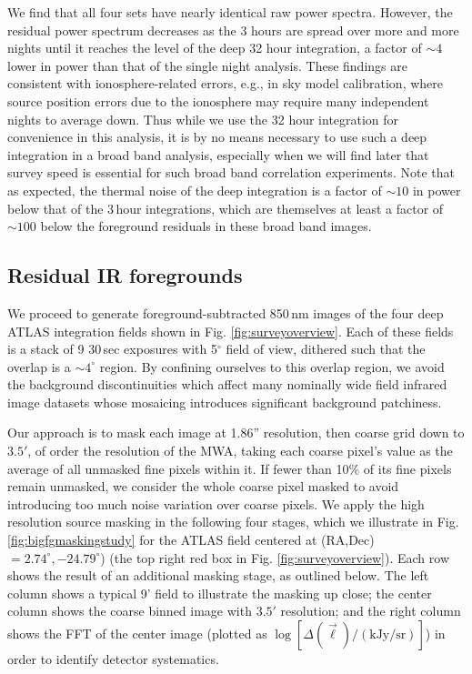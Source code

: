 \documentclass{emulateapj}
\begin{document}
We find that all four sets have nearly identical raw power spectra. However, the residual power spectrum decreases as the 3 hours are spread over more and more nights until it reaches the level of the deep 32 hour integration, a factor of $\sim4$ lower in power than that of the single night analysis. These findings are consistent with ionosphere-related errors, e.g., in sky model calibration, where source position errors due to the ionosphere may require many independent nights to average down. Thus while we use the 32 hour integration for convenience in this analysis, it is by no means necessary to use such a deep integration in a broad band analysis, especially when we will find later that survey speed is essential for such broad band correlation experiments. Note that as expected, the thermal noise of the deep integration is a factor of $\sim10$ in power below that of the 3\,hour integrations, which are themselves at least a factor of $\sim100$ below the foreground residuals in these broad band images.

\subsection{Residual IR foregrounds}
\label{sec:resirfg}

We proceed to generate foreground-subtracted 850\,nm images of the four deep ATLAS integration fields shown in Fig. \ref{fig:surveyoverview}. Each of these fields is a stack of 9 30\,sec exposures with 5$^\circ$ field of view, dithered such that the overlap is a $\sim4^\circ$ region. By confining ourselves to this overlap region, we avoid the background discontinuities which affect many nominally wide field infrared image datasets whose mosaicing introduces significant background patchiness. 

Our approach is to mask each image at 1.86'' resolution, then coarse grid down to $3.5'$, of order the resolution of the MWA, taking each coarse pixel's value as the average of all unmasked fine pixels within it. If fewer than 10\% of its fine pixels remain unmasked, we consider the whole coarse pixel masked to avoid introducing too much noise variation over coarse pixels. We apply the high resolution source masking in the following four stages, which we illustrate in Fig. \ref{fig:bigfgmaskingstudy} for the ATLAS field centered at (RA,Dec)$=2.74^\circ, -24.79^\circ$) (the top right red box in Fig. \ref{fig:surveyoverview}). Each row shows the result of an additional masking stage, as outlined below. The left column shows a typical 9' field to illustrate the masking up close; the center column shows the coarse binned image with $3.5'$ resolution; and the right column shows the FFT of the center image (plotted as $\log[\Delta(\vec{\ell})/(\text{kJy/sr})]$) in order to identify detector systematics. 
\end{document}
